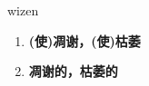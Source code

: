 
\begin{frame}
{\huge wizen}
\begin{center}
\begin{enumerate}\Large
  \item \textbf{(使)凋谢，(使)枯萎}
  \item \textbf{凋谢的，枯萎的}
\end{enumerate}
\end{center}
\end{frame}
